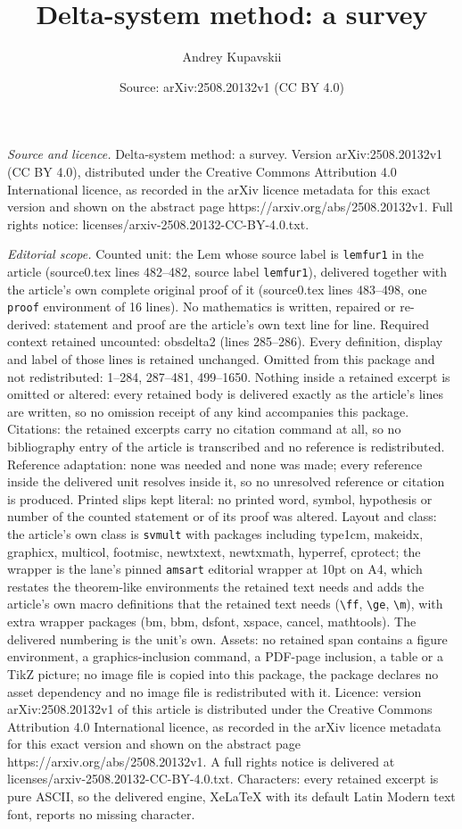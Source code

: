 \documentclass[10pt,a4paper]{amsart}
\title[Delta-system method: a survey]{Delta-system method: a survey}
\author{Andrey Kupavskii}
\date{Source: arXiv:2508.20132v1 (CC BY 4.0)}
\begin{document}
\maketitle

\noindent\emph{Source and licence.} Delta-system method: a survey. Version arXiv:2508.20132v1 (CC BY 4.0), distributed under the Creative Commons Attribution 4.0 International licence, as recorded in the arXiv licence metadata for this exact version and shown on the abstract page https://arxiv.org/abs/2508.20132v1. Full rights notice: licenses/arxiv-2508.20132-CC-BY-4.0.txt.\par\smallskip

\noindent\textit{Editorial scope.} Counted unit: the Lem whose source label is \texttt{lemfur1} in the article (source0.tex lines 482--482, source label \texttt{lemfur1}), delivered together with the article's own complete original proof of it (source0.tex lines 483--498, one \texttt{proof} environment of 16 lines). No mathematics is written, repaired or re-derived: statement and proof are the article's own text line for line. Required context retained uncounted: obsdelta2 (lines 285--286). Every definition, display and label of those lines is retained unchanged. Omitted from this package and not redistributed: 1--284, 287--481, 499--1650. Nothing inside a retained excerpt is omitted or altered: every retained body is delivered exactly as the article's lines are written, so no omission receipt of any kind accompanies this package. Citations: the retained excerpts carry no citation command at all, so no bibliography entry of the article is transcribed and no reference is redistributed. Reference adaptation: none was needed and none was made; every reference inside the delivered unit resolves inside it, so no unresolved reference or citation is produced. Printed slips kept literal: no printed word, symbol, hypothesis or number of the counted statement or of its proof was altered. Layout and class: the article's own class is \texttt{svmult} with packages including type1cm, makeidx, graphicx, multicol, footmisc, newtxtext, newtxmath, hyperref, cprotect; the wrapper is the lane's pinned \texttt{amsart} editorial wrapper at 10pt on A4, which restates the theorem-like environments the retained text needs and adds the article's own macro definitions that the retained text needs (\texttt{\textbackslash ff}, \texttt{\textbackslash ge}, \texttt{\textbackslash m}), with extra wrapper packages (bm, bbm, dsfont, xspace, cancel, mathtools). The delivered numbering is the unit's own. Assets: no retained span contains a figure environment, a graphics-inclusion command, a PDF-page inclusion, a table or a TikZ picture; no image file is copied into this package, the package declares no asset dependency and no image file is redistributed with it. Licence: version arXiv:2508.20132v1 of this article is distributed under the Creative Commons Attribution 4.0 International licence, as recorded in the arXiv licence metadata for this exact version and shown on the abstract page https://arxiv.org/abs/2508.20132v1. A full rights notice is delivered at licenses/arxiv-2508.20132-CC-BY-4.0.txt. Characters: every retained excerpt is pure ASCII, so the delivered engine, XeLaTeX with its default Latin Modern text font, reports no missing character.
\end{document}
